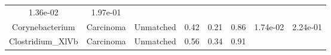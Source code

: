 \documentclass[12pt,]{article}
\begin{document}
\begin{longtable}[]{@{}cccccccc@{}}
\begin{minipage}[t]{0.06\columnwidth}
1.36e-02\strut
\end{minipage} & \begin{minipage}[t]{0.06\columnwidth}\centering\strut
1.97e-01\strut
\end{minipage}\tabularnewline
\begin{minipage}[t]{0.19\columnwidth}\centering\strut
Corynebacterium\strut
\end{minipage} & \begin{minipage}[t]{0.07\columnwidth}\centering\strut
Carcinoma\strut
\end{minipage} & \begin{minipage}[t]{0.09\columnwidth}\centering\strut
Unmatched\strut
\end{minipage} & \begin{minipage}[t]{0.03\columnwidth}\centering\strut
0.42\strut
\end{minipage} & \begin{minipage}[t]{0.14\columnwidth}\centering\strut
0.21\strut
\end{minipage} & \begin{minipage}[t]{0.14\columnwidth}\centering\strut
0.86\strut
\end{minipage} & \begin{minipage}[t]{0.06\columnwidth}\centering\strut
1.74e-02\strut
\end{minipage} & \begin{minipage}[t]{0.06\columnwidth}\centering\strut
2.24e-01\strut
\end{minipage}\tabularnewline
\begin{minipage}[t]{0.19\columnwidth}\centering\strut
Clostridium\_XlVb\strut
\end{minipage} & \begin{minipage}[t]{0.07\columnwidth}\centering\strut
Carcinoma\strut
\end{minipage} & \begin{minipage}[t]{0.09\columnwidth}\centering\strut
Unmatched\strut
\end{minipage} & \begin{minipage}[t]{0.03\columnwidth}\centering\strut
0.56\strut
\end{minipage} & \begin{minipage}[t]{0.14\columnwidth}\centering\strut
0.34\strut
\end{minipage} & \begin{minipage}[t]{0.14\columnwidth}\centering\strut
0.91\strut
\end{minipage} & \begin{minipage}[t]{0.06\columnwidth}\centering\strut

\end{minipage}
\end{longtable}
\end{document}
